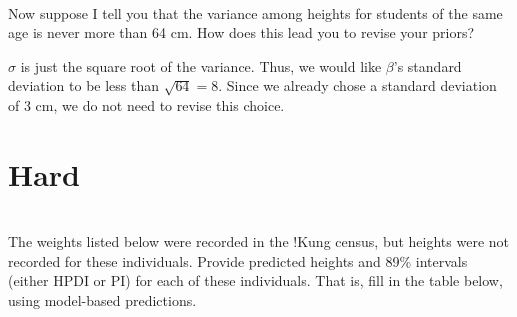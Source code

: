 \documentclass[12pt]{article}\usepackage[]{graphicx}\usepackage[]{color}
\newenvironment{problem}[2][Problem]{\begin{trivlist}
\item[\hskip \labelsep {\bfseries #1}\hskip \labelsep {\bfseries #2.}]}{\end{trivlist}}
\begin{document}
\begin{problem}{4M6}
\text{}\\
Now suppose I tell you that the variance among heights for students of the same age is never more than 64 cm. How does this lead you to revise your priors?
\end{problem}

$\sigma$ is just the square root of the variance. Thus, we would like $\beta$'s standard deviation to be less than $\sqrt{64}=8$. Since we already chose a standard deviation of 3 cm, we do not need to revise this choice.

\section{Hard}

\begin{problem}{4H1}
\text{}\\
The weights listed below were recorded in the !Kung census, but heights were not recorded for these individuals. Provide predicted heights and 89\% intervals (either HPDI or PI) for each of these individuals. That is, fill in the table below, using model-based predictions.
\end{problem}
\end{document}
